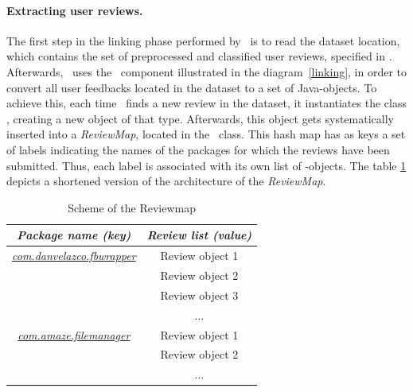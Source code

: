 \paragraph{Extracting user reviews.} 
The first step in the linking phase performed by \toolname\, is to read the dataset location, which contains the set of preprocessed and classified user reviews, specified in \Config.
Afterwards, \toolname\ uses the \ReviewC\ component illustrated in the diagram~\ref{linking}, in order to convert all user feedbacks located in the dataset to a set of Java-objects. 
To achieve this, each time \toolname\ finds a new review in the dataset, it instantiates the class \Review, creating a new object of that type. 
Afterwards, this object gets systematically inserted into a \textit{ReviewMap}, located in the \ReviewC\ class. 
This hash map has as keys a set of labels indicating the names of the packages for which the reviews have been submitted. Thus, each label is associated with its own list of \Review-objects. 
The table \ref{tbl: reviewmap} depicts a shortened version of the architecture of the \textit{ReviewMap}.
\begin{table}[tb]
\centering
\caption{Scheme of the Reviewmap}
\label{tbl: reviewmap}
\begin{tabular}{c|c|}
\hline
\multicolumn{1}{|c|}{\textit{\textbf{Package name (key)}}}    & \textit{\textbf{Review list (value)}} \\ \hline
\multicolumn{1}{|c|}{{\ul \textit{com.danvelazco.fbwrapper}}} & Review object 1                       \\ \hline
                                                              & Review object 2                       \\ \cline{2-2} 
                                                              & Review object 3                       \\ \cline{2-2} 
                                                              & ...                                   \\ \hline
\multicolumn{1}{|c|}{{\ul \textit{com.amaze.filemanager}}}    & Review object 1                       \\ \hline
                                                              & Review object 2                       \\ \cline{2-2} 
                                                              & ...                                   \\ \cline{2-2} 
\end{tabular}
\end{table}\\
